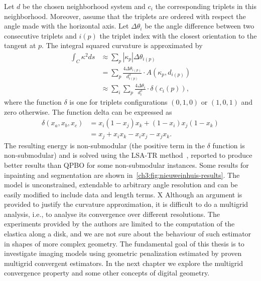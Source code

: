 Let $d$ be the chosen neighborhood system and $c_i$ the corresponding triplets in this neighborhood. Moreover, assume that the triplets are ordered with respect the angle made with the horizontal axis. Let $\Delta \theta_i$ be the angle difference between two consecutive triplets and $i(p)$ the triplet index with the closest orientation to the tangent at $p$. The integral squared curvature is approximated by 
\begin{align*}
	\int_{C}{\kappa ^2 ds} &\approx \sum_{p}{ |\kappa_{p}|\Delta \theta_{i(p)}} \\
	&= \sum_{p} \frac{4\Delta \theta _{i(p)}}{d^3_{i(p)}} \cdot A(\kappa_p,d_{i(p)}) \\
	&\approx \sum_{i}\sum_{p} \frac{4\Delta \theta _i}{d^3_i} \cdot \delta(c_i(p)),
\end{align*}
%
where the function $\delta$ is one for triplets configurations $(0,1,0)$ or $(1,0,1)$ and zero otherwise. The function delta can be expressed as
\begin{align*}
	\delta(x_a,x_b,x_c) &= x_i(1-x_j)x_k + (1-x_i)x_j(1-x_k) \\
	&= x_j + x_ix_k - x_ix_j - x_jx_k.
\end{align*}
%
The resulting energy is non-submodular (the positive term in the $\delta$ function is non-submodular) and is solved using the LSA-TR method~\cite{gorelick14local}, reported to produce better results than QPBO for some non-submodular instances. Some results for inpainting and segmentation are shown in~\cref{ch3:fig:nieuweinhuis-results}. The model is unconstrained, extendable to arbitrary angle resolution and can be easily modified to include data and length terms. 
X
Although an argument is provided to justify the curvature approximation, it is difficult to do a multigrid analysis, i.e., to analyse its convergence over different resolutions. The experiments provided by the authors are limited to the computation of the elastica along a disk, and we are not sure about the behaviour of such estimator in shapes of more complex geometry. The fundamental goal of this thesis is to investigate imaging models using geometric penalization estimated by proven multigrid convergent estimators. In the next chapter we explore the multigrid convergence property and some other concepts of digital geometry.

